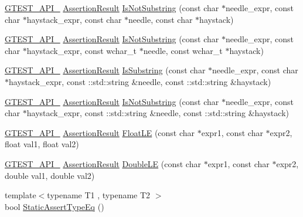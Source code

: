 \begin{DoxyCompactItemize}
\hyperlink{gtest-port_8h_aa73be6f0ba4a7456180a94904ce17790}{G\+T\+E\+S\+T\+\_\+\+A\+P\+I\+\_\+} \hyperlink{classtesting_1_1AssertionResult}{Assertion\+Result} \hyperlink{namespacetesting_a2288dcf4249f88af67dcd46544dc49a6}{Is\+Not\+Substring} (const char $\ast$needle\+\_\+expr, const char $\ast$haystack\+\_\+expr, const char $\ast$needle, const char $\ast$haystack)
\item 
\hyperlink{gtest-port_8h_aa73be6f0ba4a7456180a94904ce17790}{G\+T\+E\+S\+T\+\_\+\+A\+P\+I\+\_\+} \hyperlink{classtesting_1_1AssertionResult}{Assertion\+Result} \hyperlink{namespacetesting_a53e5c6e91ea429c43de7f4f57e33d166}{Is\+Not\+Substring} (const char $\ast$needle\+\_\+expr, const char $\ast$haystack\+\_\+expr, const wchar\+\_\+t $\ast$needle, const wchar\+\_\+t $\ast$haystack)
\item 
\hyperlink{gtest-port_8h_aa73be6f0ba4a7456180a94904ce17790}{G\+T\+E\+S\+T\+\_\+\+A\+P\+I\+\_\+} \hyperlink{classtesting_1_1AssertionResult}{Assertion\+Result} \hyperlink{namespacetesting_a571c7edcfc574269833ebe3e7d338ec5}{Is\+Substring} (const char $\ast$needle\+\_\+expr, const char $\ast$haystack\+\_\+expr, const \+::std\+::string \&needle, const \+::std\+::string \&haystack)
\item 
\hyperlink{gtest-port_8h_aa73be6f0ba4a7456180a94904ce17790}{G\+T\+E\+S\+T\+\_\+\+A\+P\+I\+\_\+} \hyperlink{classtesting_1_1AssertionResult}{Assertion\+Result} \hyperlink{namespacetesting_abe7b3fa1c9528745f934d4a14155ea87}{Is\+Not\+Substring} (const char $\ast$needle\+\_\+expr, const char $\ast$haystack\+\_\+expr, const \+::std\+::string \&needle, const \+::std\+::string \&haystack)
\item 
\hyperlink{gtest-port_8h_aa73be6f0ba4a7456180a94904ce17790}{G\+T\+E\+S\+T\+\_\+\+A\+P\+I\+\_\+} \hyperlink{classtesting_1_1AssertionResult}{Assertion\+Result} \hyperlink{namespacetesting_a2c9a2a391c72a7b02ea3024586e33af0}{Float\+LE} (const char $\ast$expr1, const char $\ast$expr2, float val1, float val2)
\item 
\hyperlink{gtest-port_8h_aa73be6f0ba4a7456180a94904ce17790}{G\+T\+E\+S\+T\+\_\+\+A\+P\+I\+\_\+} \hyperlink{classtesting_1_1AssertionResult}{Assertion\+Result} \hyperlink{namespacetesting_ae10e2bb304b74abd1b06a2d912a8b43b}{Double\+LE} (const char $\ast$expr1, const char $\ast$expr2, double val1, double val2)
\item 
{\footnotesize template$<$typename T1 , typename T2 $>$ }\\bool \hyperlink{namespacetesting_a661e70fc6afeb5c085eed3716aa45059}{Static\+Assert\+Type\+Eq} ()

\end{DoxyCompactItemize}
